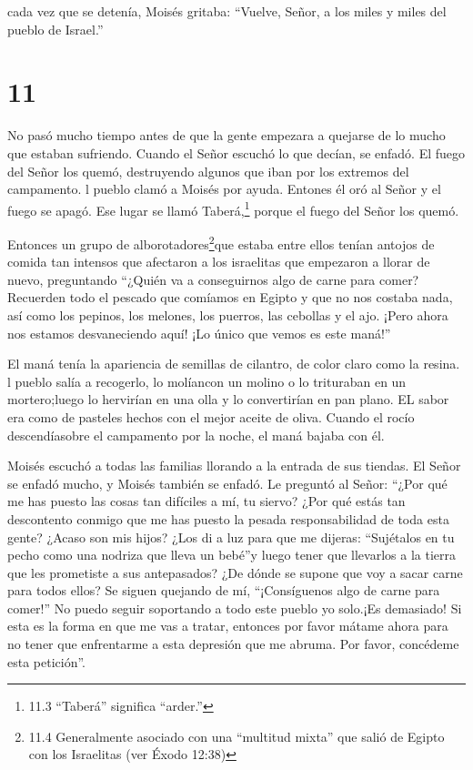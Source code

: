  cada vez que se detenía, Moisés gritaba: ``Vuelve, Señor,
a los miles y miles del pueblo de Israel.''

\hypertarget{section-10}{%
\section{11}\label{section-10}}

 No pasó mucho tiempo antes de que la gente empezara a
quejarse de lo mucho que estaban sufriendo. Cuando el Señor escuchó lo
que decían, se enfadó. El fuego del Señor los quemó, destruyendo algunos
que iban por los extremos del campamento.  l pueblo clamó a
Moisés por ayuda. Entones él oró al Señor y el fuego se apagó.
 Ese lugar se llamó Taberá,\footnote{11.3 ``Taberá''
  significa ``arder.''} porque el fuego del Señor los quemó.

 Entonces un grupo de alborotadores\footnote{11.4
  Generalmente asociado con una ``multitud mixta'' que salió de Egipto
  con los Israelitas (ver Éxodo 12:38)}que estaba entre ellos tenían
antojos de comida tan intensos que afectaron a los israelitas que
empezaron a llorar de nuevo, preguntando ``¿Quién va a conseguirnos algo
de carne para comer?  Recuerden todo el pescado que comíamos
en Egipto y que no nos costaba nada, así como los pepinos, los melones,
los puerros, las cebollas y el ajo.  ¡Pero ahora nos estamos
desvaneciendo aquí! ¡Lo único que vemos es este maná!''

 El maná tenía la apariencia de semillas de cilantro, de
color claro como la resina.  l pueblo salía a recogerlo, lo
molíancon un molino o lo trituraban en un mortero;luego lo hervirían en
una olla y lo convertirían en pan plano. EL sabor era como de pasteles
hechos con el mejor aceite de oliva.  Cuando el rocío
descendíasobre el campamento por la noche, el maná bajaba con él.

 Moisés escuchó a todas las familias llorando a la entrada
de sus tiendas. El Señor se enfadó mucho, y Moisés también se enfadó.
 Le preguntó al Señor: ``¿Por qué me has puesto las cosas
tan difíciles a mí, tu siervo? ¿Por qué estás tan descontento conmigo
que me has puesto la pesada responsabilidad de toda esta gente?
 ¿Acaso son mis hijos? ¿Los di a luz para que me dijeras:
``Sujétalos en tu pecho como una nodriza que lleva un bebé''y luego
tener que llevarlos a la tierra que les prometiste a sus antepasados?
 ¿De dónde se supone que voy a sacar carne para todos
ellos? Se siguen quejando de mí, ``¡Consíguenos algo de carne para
comer!''  No puedo seguir soportando a todo este pueblo yo
solo.¡Es demasiado!  Si esta es la forma en que me vas a
tratar, entonces por favor mátame ahora para no tener que enfrentarme a
esta depresión que me abruma. Por favor, concédeme esta petición''.

